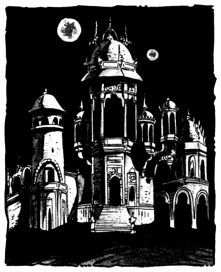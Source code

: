 \begin{figure}[b!]
\centering
\includegraphics[width=\columnwidth]{images/raam-1.png}
\end{figure}

